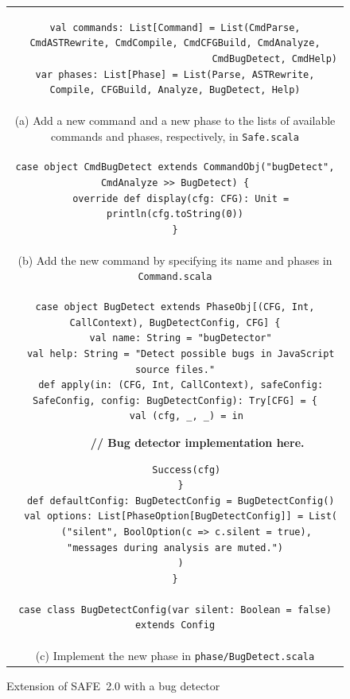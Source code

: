 \documentclass[10pt, conference]{IEEEtran}
\newcommand{\mtt}[1]{\texttt{\small #1}}
\newcommand{\safe}{{SAFE~2.0}\xspace}
\begin{document}
\setcounter{figure}{1}
\begin{figure}[t]
\centering
\begin{tabular}{c}
\begin{minipage}{.95\textwidth}
\footnotesize
\begin{verbatim}
val commands: List[Command] = List(CmdParse, CmdASTRewrite, CmdCompile, CmdCFGBuild, CmdAnalyze,
                                   CmdBugDetect, CmdHelp)
var phases: List[Phase] = List(Parse, ASTRewrite, Compile, CFGBuild, Analyze, BugDetect, Help)
\end{verbatim}
\end{minipage}
\\[1.5em]
{\small (a) Add a new command and a new phase to the lists of available
commands and phases, respectively, in \mtt{Safe.scala}}
\\[1em]
\begin{minipage}{.95\textwidth}
\footnotesize
\begin{verbatim}
case object CmdBugDetect extends CommandObj("bugDetect", CmdAnalyze >> BugDetect) {
  override def display(cfg: CFG): Unit = println(cfg.toString(0))
}
\end{verbatim}
\end{minipage}
\\[1em]
{\small (b) Add the new command by specifying its name and phases in \mtt{Command.scala}}
\\[1em]
\begin{minipage}{.95\textwidth}
\footnotesize
\begin{verbatim}
case object BugDetect extends PhaseObj[(CFG, Int, CallContext), BugDetectConfig, CFG] {
  val name: String = "bugDetector"
  val help: String = "Detect possible bugs in JavaScript source files."
  def apply(in: (CFG, Int, CallContext), safeConfig: SafeConfig, config: BugDetectConfig): Try[CFG] = {
    val (cfg, _, _) = in
\end{verbatim}
\vspace*{-.6em}
\textbf{~~~~~~~// Bug detector implementation here.}
\vspace*{-.8em}
\begin{verbatim}
    Success(cfg)
  }
  def defaultConfig: BugDetectConfig = BugDetectConfig()
  val options: List[PhaseOption[BugDetectConfig]] = List(
    ("silent", BoolOption(c => c.silent = true), "messages during analysis are muted.")
  )
}

case class BugDetectConfig(var silent: Boolean = false) extends Config

\end{verbatim}
\end{minipage}
\\
{\small (c) Implement the new phase in \mtt{phase/BugDetect.scala}}
\end{tabular}
\caption{\small Extension of \safe with a bug detector~\cite{jswapp}}
\label{fig:extensibility}
\end{figure}
\end{document}
